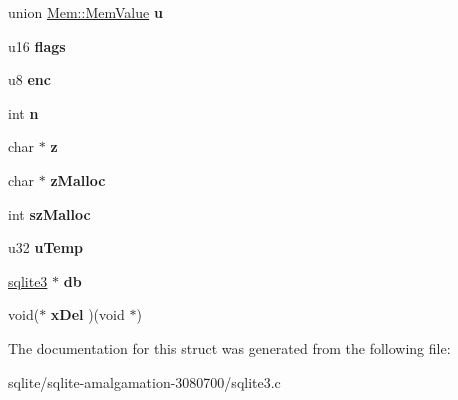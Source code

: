 \begin{DoxyCompactItemize}
\item 
\hypertarget{struct_mem_ac280628b51c0d03433ce3a05821b2911}{union \hyperlink{union_mem_1_1_mem_value}{Mem\+::\+Mem\+Value} {\bfseries u}}\label{struct_mem_ac280628b51c0d03433ce3a05821b2911}

\item 
\hypertarget{struct_mem_a209bf3317161d1e33af9fe8b512f4974}{u16 {\bfseries flags}}\label{struct_mem_a209bf3317161d1e33af9fe8b512f4974}

\item 
\hypertarget{struct_mem_af437c99e92b8e729b70f82fa94e96bff}{u8 {\bfseries enc}}\label{struct_mem_af437c99e92b8e729b70f82fa94e96bff}

\item 
\hypertarget{struct_mem_a5a613756e096c221ec68077c28424d84}{int {\bfseries n}}\label{struct_mem_a5a613756e096c221ec68077c28424d84}

\item 
\hypertarget{struct_mem_a85c51a0b445063ba913693517860f5ea}{char $\ast$ {\bfseries z}}\label{struct_mem_a85c51a0b445063ba913693517860f5ea}

\item 
\hypertarget{struct_mem_a68cd8f196d9dc8ab27845e1b4abbc95c}{char $\ast$ {\bfseries z\+Malloc}}\label{struct_mem_a68cd8f196d9dc8ab27845e1b4abbc95c}

\item 
\hypertarget{struct_mem_a857df48ae7c5d3af4a8a8a3ed95bc873}{int {\bfseries sz\+Malloc}}\label{struct_mem_a857df48ae7c5d3af4a8a8a3ed95bc873}

\item 
\hypertarget{struct_mem_a36fce871381c6e796488034e41388a83}{u32 {\bfseries u\+Temp}}\label{struct_mem_a36fce871381c6e796488034e41388a83}

\item 
\hypertarget{struct_mem_a478da33d1e83a23931b372f9ddc706f2}{\hyperlink{structsqlite3}{sqlite3} $\ast$ {\bfseries db}}\label{struct_mem_a478da33d1e83a23931b372f9ddc706f2}

\item 
\hypertarget{struct_mem_a081ea2f86933d68a8940785b62f638ef}{void($\ast$ {\bfseries x\+Del} )(void $\ast$)}\label{struct_mem_a081ea2f86933d68a8940785b62f638ef}

\end{DoxyCompactItemize}


The documentation for this struct was generated from the following file\+:\begin{DoxyCompactItemize}
\item 
sqlite/sqlite-\/amalgamation-\/3080700/sqlite3.\+c\end{DoxyCompactItemize}
